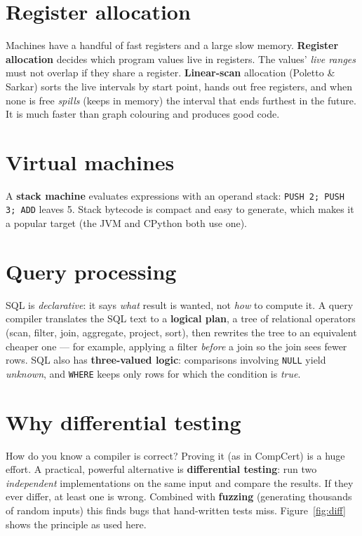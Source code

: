 \section{Register allocation}
Machines have a handful of fast registers and a large slow memory. \textbf{Register allocation} decides which program values live in registers. The values' \emph{live ranges} must not overlap if they share a register. \textbf{Linear-scan} allocation (Poletto \& Sarkar) sorts the live intervals by start point, hands out free registers, and when none is free \emph{spills} (keeps in memory) the interval that ends furthest in the future. It is much faster than graph colouring and produces good code.

\section{Virtual machines}
A \textbf{stack machine} evaluates expressions with an operand stack: \verb|PUSH 2; PUSH 3; ADD| leaves 5. Stack bytecode is compact and easy to generate, which makes it a popular target (the JVM and CPython both use one).

\section{Query processing}
SQL is \emph{declarative}: it says \emph{what} result is wanted, not \emph{how} to compute it. A query compiler translates the SQL text to a \textbf{logical plan}, a tree of relational operators (scan, filter, join, aggregate, project, sort), then rewrites the tree to an equivalent cheaper one --- for example, applying a filter \emph{before} a join so the join sees fewer rows. SQL also has \textbf{three-valued logic}: comparisons involving \texttt{NULL} yield \emph{unknown}, and \texttt{WHERE} keeps only rows for which the condition is \emph{true}.

\section{Why differential testing}
How do you know a compiler is correct? Proving it (as in CompCert) is a huge effort. A practical, powerful alternative is \textbf{differential testing}: run two \emph{independent} implementations on the same input and compare the results. If they ever differ, at least one is wrong. Combined with \textbf{fuzzing} (generating thousands of random inputs) this finds bugs that hand-written tests miss. Figure~\ref{fig:diff} shows the principle as used here.

